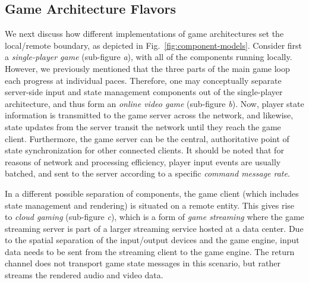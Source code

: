 


\subsection{Game Architecture Flavors}

We next discuss how different implementations of game architectures set the local/remote boundary, as depicted in Fig.~\ref{fig:component-models}. Consider first a \textit{single-player game} (sub-figure \textit{a}), with all of the components running locally. However, we previously mentioned that the three parts of the main game loop each progress at individual paces. Therefore, one may conceptually separate server-side input and state management components out of the single-player architecture, and thus form an \textit{online video game} (sub-figure \textit{b}). Now, player state information is transmitted to the game server across the network, and likewise, state updates from the server transit the network until they reach the game client.
Furthermore, the game server can be the central, authoritative point of state synchronization for other connected clients.
It should be noted that for reasons of network and processing efficiency, player input events are usually batched, and sent to the server according to a specific \textit{command message rate}.


In a different possible separation of components, the game client (which includes state management and rendering) is situated on a remote entity. This gives rise to \textit{cloud gaming} (sub-figure \textit{c}), which is a form of \textit{game streaming} where the game streaming server is part of a larger streaming service hosted at a data center. Due to the spatial separation of the input/output devices and the game engine, input data needs to be sent from the streaming client to the game engine. The return channel does not transport game state messages in this scenario, but rather streams the rendered audio and video data.

